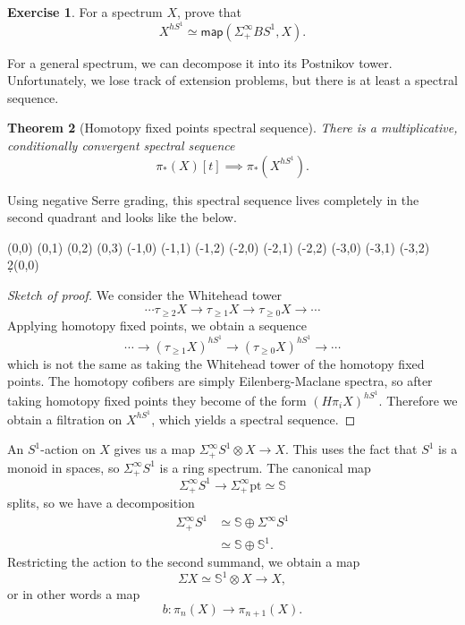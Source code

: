\documentclass[10pt, oneside]{memoir}
\newtheorem{thm}{Theorem}[subsection]
\theoremstyle{definition}
\newtheorem{exer}[thm]{Exercise}
\theoremstyle{remark}
\theoremstyle{plain}
\theoremstyle{definition}
\theoremstyle{remark}
\newcommand{\bS}{\mathbb{S}}
\newcommand{\mr}[1]{\mathrm{#1}}
\newcommand{\ms}[1]{\mathsf{#1}}
\newcommand{\1}{\mathbf{1}}
\newcommand{\2}{\mathbf{2}}
\newcommand{\3}{\mathbf{3}}
\begin{document}
\begin{exer}
    For a spectrum \(X \), prove that
    \[ X^{hS^1} \simeq \ms{map}(\Sigma_+^{\infty} BS^1, X). \]
\end{exer}

For a general spectrum, we can decompose it into its Postnikov tower. Unfortunately, we lose track of extension problems, but there is at least a spectral sequence.

\begin{thm}[Homotopy fixed points spectral sequence]
    There is a multiplicative, conditionally convergent spectral sequence
    \[ \pi_*(X)[t] \implies \pi_*(X^{hS^1}). \]
\end{thm}

Using negative Serre grading, this spectral sequence lives completely in the second quadrant and looks like the below.
\begin{center}
    \begin{sseqdata}[classes={draw=none}, name=hfp, homological Serre
        grading, xscale=1, y axis gap = 2em, axes type = frame] 
        \class["\pi_0(X)"](0,0)
        \class["\pi_1(X)"](0,1)
        \class["\pi_2(X)"](0,2)
        \class["\pi_3(X)"](0,3)
        \class["0"](-1,0)
        \class["0"](-1,1)
        \class["0"](-1,2)
        \class["\pi_0(X) \cdot t"](-2,0) 
        \class["\pi_1(X) \cdot t"](-2,1) 
        \class["\pi_2(X) \cdot t"](-2,2) 
        \class["0"](-3,0)
        \class["0"](-3,1)
        \class["0"](-3,2)
        \d2(0,0)
    \end{sseqdata} 
    \printpage[name=hfp, page=2] 
\end{center}

\begin{proof}[Sketch of proof]
    We consider the Whitehead tower
    \[ \cdots \tau_{\geq 2} X \to \tau_{\geq 1} X \to \tau_{\geq 0} X \to \cdots \]
    Applying homotopy fixed points, we obtain a sequence
    \[ \cdots \to (\tau_{\geq 1} X)^{h S^1} \to (\tau_{\geq 0} X)^{hS^1} \to \cdots \]
    which is not the same as taking the Whitehead tower of the homotopy fixed points. The homotopy cofibers are simply Eilenberg-Maclane spectra, so after taking homotopy fixed points they become of the form \((H \pi_i X)^{hS^1} \). Therefore we obtain a filtration on \(X^{hS^1} \), which yields a spectral sequence.
\end{proof}

An \(S^1 \)-action on \(X \) gives us a map \(\Sigma_+^{\infty} S^1 \otimes X \to X \). This uses the fact that \(S^1 \) is a monoid in spaces, so \(\Sigma_+^{\infty} S^1 \) is a ring spectrum. The canonical map
\[ \Sigma_+^{\infty} S^1 \to \Sigma_+^{\infty} \mr{pt} \simeq \bS \]
splits, so we have a decomposition
\begin{align*}
    \Sigma_+^{\infty} S^1 &\simeq \bS \oplus \Sigma^{\infty} S^1 \\
    &\simeq \bS \oplus \bS^1.
\end{align*}
Restricting the action to the second summand, we obtain a map
\[ \Sigma X \simeq \bS^1 \otimes X \to X, \]
or in other words a map
\[ b \colon \pi_n(X) \to \pi_{n+1}(X). \]
\end{document}
